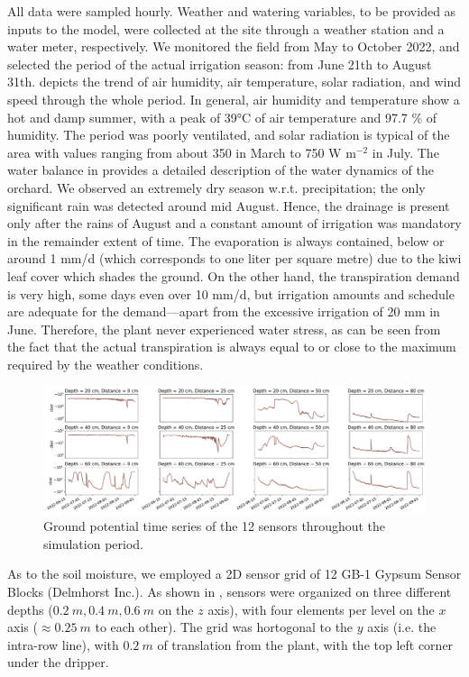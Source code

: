 All data were sampled hourly.
Weather and watering variables, to be provided as inputs to the model, were  collected at the site through a weather station and a water meter, respectively.
We monitored the field from May to October 2022, and selected the period of the actual irrigation season: from June 21th to August 31th.
 depicts the trend of air humidity, air temperature, solar radiation, and wind speed through the whole period.
In general, air humidity and temperature show a hot and damp summer, with a peak of 39°C of air temperature and 97.7 \% of humidity.
The period was poorly ventilated, and solar radiation is typical of the area with values ranging from about 350  in March to 750 W m$^{-2}$ in July.
The water balance in  provides a detailed description of the water dynamics of the orchard.
%
We observed an extremely dry season w.r.t. precipitation; the only significant rain was detected around mid August.
%
Hence, the drainage is present only after the rains of August and a constant amount of irrigation was mandatory in the remainder extent of time.
%
The evaporation is always contained, below or around 1 mm/d (which corresponds to one liter per square metre) due to the kiwi leaf cover which shades the ground.
%
On the other hand, the transpiration demand is very high, some days even over 10 mm/d, but irrigation amounts and schedule are adequate for the demand---apart from the excessive irrigation of 20 mm in June.
%
Therefore, the plant never experienced water stress, as can be seen from the fact that the actual transpiration  is always equal to or close to the maximum required by the weather conditions.

\begin{figure}[t]
    \centering
    \includegraphics[scale=.3]{chapters/physics-aware/orchard/img/ground_potential.pdf}
    \caption{Ground potential time series of the 12 sensors throughout the simulation period. }
    \label{orchard-fig:ground_potential}
\end{figure}

As to the soil moisture, we employed a 2D sensor grid of 12 GB-1 Gypsum Sensor Blocks (Delmhorst Inc.). As shown in , sensors were organized on three different depths ($0.2~m, 0.4~m, 0.6~m$ on the $z$ axis), with four elements per level on the $x$ axis ($\approx 0.25~m$ to each other). The grid was hortogonal to the $y$ axis (i.e. the intra-row line), with $0.2~m$ of translation from the plant, with the top left corner under the dripper. 

